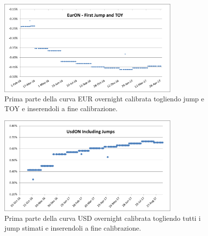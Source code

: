 \begin{tframe}
\begin{figure}[!h]
\centering
\includegraphics[width=0.8\textwidth]{firstjumpeur3.png}
\caption{Prima parte della curva EUR overnight calibrata togliendo jump e TOY e inserendoli a fine calibrazione.}
\label{fig:firstjumpeur3}
\end{figure}
\end{tframe}
\begin{tframe}
\begin{figure}[!h]
\centering
\includegraphics[width=0.8\textwidth]{firstjumpusd3.png}
\caption{Prima parte della curva USD overnight calibrata togliendo tutti i jump stimati e inserendoli a fine calibrazione.}
\label{fig:firstjumpusd3}
\end{figure}
\end{tframe}

